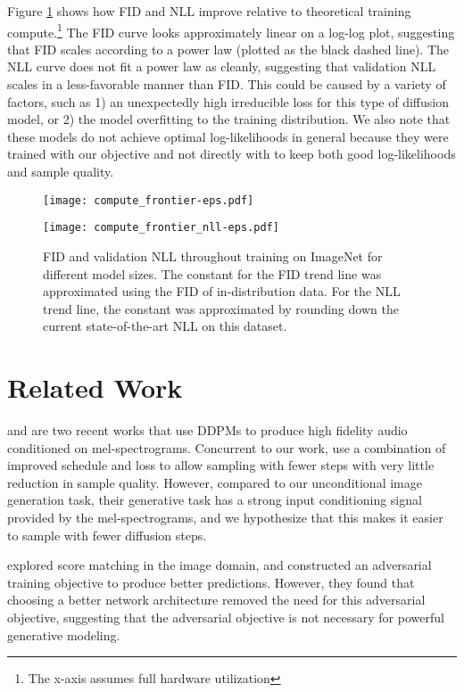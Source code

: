 \documentclass{article}
\begin{document}
Figure \ref{fig:computevsfidnll} shows how FID and NLL improve relative to theoretical training compute.\footnote{The x-axis assumes full hardware utilization} The FID curve looks approximately linear on a log-log plot, suggesting that FID scales according to a power law (plotted as the black dashed line). The NLL curve does not fit a power law as cleanly, suggesting that validation NLL scales in a less-favorable manner than FID. This could be caused by a variety of factors, such as 1) an unexpectedly high irreducible loss \citep{scalingcompendium} for this type of diffusion model, or 2) the model overfitting to the training distribution. We also note that these models do not achieve optimal log-likelihoods in general because they were trained with our  objective and not directly with  to keep both good log-likelihoods and sample quality.
\begin{figure}[t]
\begin{center}
\centerline{\texttt{[image: compute\_frontier-eps.pdf]}}
\centerline{\texttt{[image: compute\_frontier\_nll-eps.pdf]}}
\caption{\label{fig:computevsfidnll} FID and validation NLL throughout training on ImageNet  for different model sizes. The constant for the FID trend line was approximated using the FID of in-distribution data. For the NLL trend line, the constant was approximated by rounding down the current state-of-the-art NLL \citep{routingtransformer} on this dataset.}
\end{center}
\vskip -0.4in
\end{figure}
\section{Related Work}
\citet{wavegrad} and \citet{diffwave} are two recent works that use DDPMs to produce high fidelity audio conditioned on mel-spectrograms. Concurrent to our work, \citet{wavegrad} use a combination of improved schedule and  loss to allow sampling with fewer steps with very little reduction in sample quality. However, compared to our unconditional image generation task, their generative task has a strong input conditioning signal provided by the mel-spectrograms, and we hypothesize that this makes it easier to sample with fewer diffusion steps.

\citet{adversarial} explored score matching in the image domain, and constructed an adversarial training objective to produce better  predictions. However, they found that choosing a better network architecture removed the need for this adversarial objective, suggesting that the adversarial objective is not necessary for powerful generative modeling.
\end{document}
